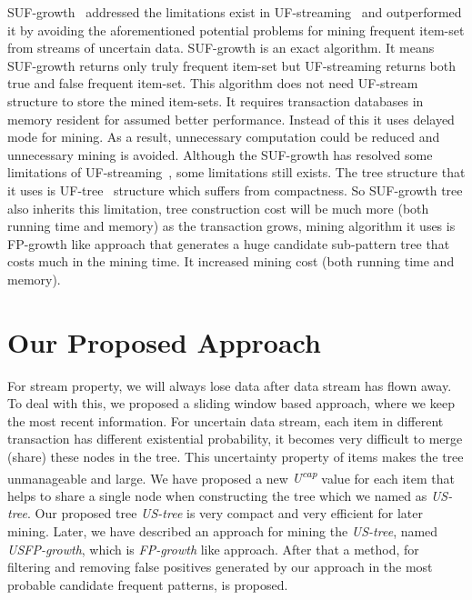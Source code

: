 \documentclass[conference]{IEEEtran}
\begin{document}
SUF-growth~\cite{DBLP:conf/icde/LeungH09} addressed the limitations exist in UF-streaming~\cite{DBLP:conf/icde/LeungH09} and outperformed it by avoiding the aforementioned potential problems for mining frequent item-set from streams of uncertain data. SUF-growth is an exact algorithm. It means SUF-growth returns only truly frequent item-set but UF-streaming returns both true and false frequent item-set. This algorithm does not need UF-stream structure to store the mined item-sets. It requires transaction databases in memory resident for assumed better performance. Instead of this it uses delayed mode for mining. As a result, unnecessary computation could be reduced and unnecessary mining is avoided.
%
Although the SUF-growth has resolved some limitations of UF-streaming~\cite{DBLP:conf/icde/LeungH09}, some limitations still exists. The tree structure that it uses is UF-tree~\cite{DBLP:conf/kdd/GadeWK04} structure which suffers from compactness. So SUF-growth tree also inherits this limitation, tree construction cost will be much more (both running time and memory) as the transaction grows, mining algorithm it uses is FP-growth like approach that generates a huge candidate sub-pattern tree that costs much in the mining time. It increased mining cost (both running time and memory).
\section{Our Proposed Approach}\label{proposedWork}
For stream property, we will always lose data after data stream has flown away. To deal with this, we proposed a sliding window based approach, where we keep the most recent information. For uncertain data stream, each item in different transaction has different existential probability, it becomes very difficult to merge (share) these nodes in the tree. This uncertainty property of items makes the tree unmanageable and large. We have proposed a new \emph{U\textsuperscript{cap}} value for each item that helps to share a single node when constructing the tree which we named as \emph{US-tree}. Our proposed tree \emph{US-tree} is very compact and very efficient for later mining. Later, we have described an approach for mining the \emph{US-tree}, named \emph{USFP-growth}, which is \emph{FP-growth} like approach. After that a method, for filtering and removing false positives generated by our approach in the most probable candidate frequent patterns, is proposed.
\end{document}
